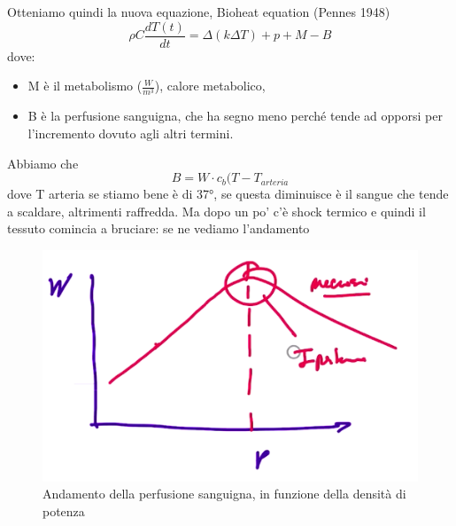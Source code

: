 \documentclass[oneside, 12pt]{extbook}
\begin{document}
Otteniamo quindi la nuova equazione, Bioheat equation (Pennes 1948)
\begin{equation}
	\rho C \frac{dT(t)}{dt} = \Delta (k \Delta T) + p + M - B
\end{equation}
dove: 
\begin{itemize}
	\item M è il metabolismo ($\frac{W}{m^3}$), calore metabolico, \item B è la perfusione sanguigna, che ha segno meno perché tende ad opporsi per l'incremento dovuto agli altri termini.
\end{itemize}
Abbiamo che 
\begin{equation}
	B = W\cdot c_b (T - T_{arteria}
\end{equation}
dove T arteria se stiamo bene è di 37°, se questa diminuisce è il sangue che tende a scaldare, altrimenti raffredda. Ma dopo un po' c'è shock termico e quindi il tessuto comincia a bruciare: se ne vediamo l'andamento
\begin{figure}[!h]
	\includegraphics[scale=0.5]{immagini/andam_perf.png}
	\caption{Andamento della perfusione sanguigna, in funzione della densità di potenza}
\end{figure}
\end{document}
